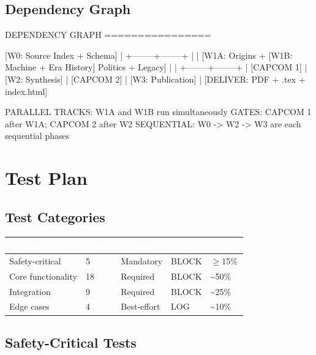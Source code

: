 \documentclass[11pt,letterpaper]{article}
\newcommand{\tableheader}[1]{\textbf{\sffamily\textcolor{white}{#1}}}
\begin{document}
\subsection{Dependency Graph}

\begin{asciibox}
DEPENDENCY GRAPH
================

  [W0: Source Index + Schema]
       |
       +--------+--------+
       |                 |
  [W1A: Origins +   [W1B: Machine +
   Era History]     Politics + Legacy]
       |                 |
       +--------+--------+
                |
          [CAPCOM 1]
                |
           [W2: Synthesis]
                |
          [CAPCOM 2]
                |
         [W3: Publication]
                |
        [DELIVER: PDF + .tex + index.html]

  PARALLEL TRACKS: W1A and W1B run simultaneously
  GATES: CAPCOM 1 after W1A; CAPCOM 2 after W2
  SEQUENTIAL: W0 -> W2 -> W3 are each sequential phases
\end{asciibox}

\section{Test Plan}

\subsection{Test Categories}

\begin{center}
\begin{tabularx}{\textwidth}{L{3cm}C{1.5cm}C{2cm}L{2cm}X}
\toprule
{}
\tableheader{Category} & \tableheader{Count} & \tableheader{Priority} & \tableheader{Failure} & \tableheader{Target} \\
\midrule
Safety-critical & 5 & Mandatory & BLOCK & $\geq$15\% \\
Core functionality & 18 & Required & BLOCK & \textasciitilde{}50\% \\
Integration & 9 & Required & BLOCK & \textasciitilde{}25\% \\
Edge cases & 4 & Best-effort & LOG & \textasciitilde{}10\% \\
\bottomrule
\end{tabularx}
\end{center}

\subsection{Safety-Critical Tests}
\end{document}
